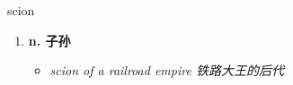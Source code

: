
\begin{frame}
{\huge scion}
\begin{center}
\begin{enumerate}\Large
  \item \textbf{n. 子孙}
  \begin{itemize}
    \item \em{\Large{scion of a railroad empire 铁路大王的后代}}
  \end{itemize}
\end{enumerate}
\end{center}
\end{frame}

